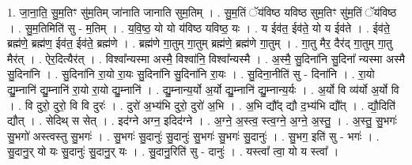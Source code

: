 \documentclass[17pt]{extarticle}
\begin{document}
1. जा॒ना॒ति॒ सु॒म॒तिꣳ सु॑म॒तिम् जा॑नाति जानाति सुम॒तिम् । . सु॒म॒तिं ॅय॑विष्ठ यविष्ठ सुम॒तिꣳ सु॑म॒तिं ॅय॑विष्ठ । . सु॒म॒तिमिति॑ सु - म॒तिम् । . य॒वि॒ष्ठ॒ यो यो य॑विष्ठ यविष्ठ॒ यः । . य ईव॑त॒ ईव॑ते॒ यो य ईव॑ते । . ईव॑ते॒ ब्रह्म॑णे॒ ब्रह्म॑ण॒ ईव॑त॒ ईव॑ते॒ ब्रह्म॑णे । . ब्रह्म॑णे गा॒तुम् गा॒तुम् ब्रह्म॑णे॒ ब्रह्म॑णे गा॒तुम् । . गा॒तु मैर॒ दैर॑द् गा॒तुम् गा॒तु मैर॑त् । . ऐर॒दित्यैर॑त् । . विश्वा᳚न्यस्मा अस्मै॒ विश्वा॑नि॒ विश्वा᳚न्यस्मै । . अ॒स्मै॒ सु॒दिना॑नि सु॒दिना᳚ न्यस्मा अस्मै सु॒दिना॑नि । . सु॒दिना॑नि रा॒यो रा॒यः सु॒दिना॑नि सु॒दिना॑नि रा॒यः । . सु॒दिना॒नीति॑ सु - दिना॑नि । . रा॒यो द्यु॒म्नानि॑ द्यु॒म्नानि॑ रा॒यो रा॒यो द्यु॒म्नानि॑ । . द्यु॒म्नान्य॒र्यो अ॒र्यो द्यु॒म्नानि॑ द्यु॒म्नान्य॒र्यः । . अ॒र्यो वि व्य॑र्यो अ॒र्यो वि । . वि दुरो॒ दुरो॒ वि वि दुरः॑ । . दुरो॑ अ॒भ्य॑भि दुरो॒ दुरो॑ अ॒भि । . अ॒भि द्यौ᳚द् द्यौ द॒भ्य॑भि द्यौ᳚त् । . द्यौ॒दिति॑ द्यौत् । . सेदिथ् स सेत् । . इद॑ग्ने अग्न॒ इदिद॑ग्ने । . अ॒ग्ने॒ अ॒स्त्व॒ स्त्व॒ग्ने॒ अ॒ग्ने॒ अ॒स्तु॒ । . अ॒स्तु॒ सु॒भगः॑ सु॒भगो॑ अस्त्वस्तु सु॒भगः॑ । . सु॒भगः॑ सु॒दानुः॑ सु॒दानुः॑ सु॒भगः॑ सु॒भगः॑ सु॒दानुः॑ । . सु॒भग॒ इति॑ सु - भगः॑ । . सु॒दानु॒र् यो यः सु॒दानुः॑ सु॒दानु॒र् यः । . सु॒दानु॒रिति॑ सु - दानुः॑ । . यस्त्वा᳚ त्वा॒ यो य स्त्वा᳚ । \newline
\end{document}
